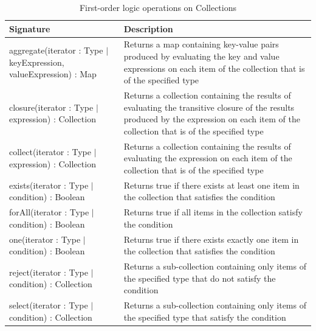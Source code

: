 \begin{longtabu} {|p{6.5cm}|X|}
\caption{First-order logic operations on Collections}
\label{tab:FirstOrderOperations}\\
\hline

    \textbf{Signature} & \textbf{Description} \\\hline

    aggregate(iterator : Type $|$ keyExpression, valueExpression) : Map & Returns a map containing key-value pairs produced by evaluating the key and value expressions on each item of the collection that is of the specified type \\\hline
    
    closure(iterator : Type $|$ expression) : Collection & Returns a collection containing the results of evaluating the transitive closure of the results produced by the expression on each item of the collection that is of the specified type \\\hline
    
    collect(iterator : Type $|$ expression) : Collection &  Returns a collection containing the results of evaluating the expression on each item of the collection that is of the specified type \\\hline
    
    exists(iterator : Type $|$ condition) : Boolean & Returns true if there exists at least one item in the collection that satisfies the condition \\\hline
    
    forAll(iterator : Type $|$ condition) : Boolean & Returns true if all items in the collection satisfy the condition \\\hline
    
    one(iterator : Type $|$ condition) : Boolean & Returns true if there exists exactly one item in the collection that satisfies the condition \\\hline
    
    reject(iterator : Type $|$ condition) : Collection & Returns a sub-collection containing only items of the specified type that do not satisfy the condition \\\hline
    
    select(iterator : Type $|$ condition) : Collection & Returns a sub-collection containing only items of the specified type that satisfy the condition \\\hline
    

\end{longtabu}
